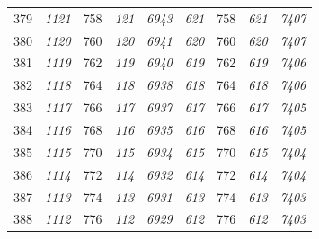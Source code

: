 \documentclass[10pt,fleqn]{article}
\begin{document}
\begin{longtable}{c|cccccccc}
379 & {\color{blue} \it 1121 \rm} & {\color{black} 758} & {\color{blue} \it 121 \rm} & {\color{blue} \it 6943 \rm} & {\color{blue} \it 621 \rm} & {\color{black} 758} & {\color{blue} \it 621 \rm} & {\color{blue} \it 7407 \rm} \\
380 & {\color{blue} \it 1120 \rm} & {\color{black} 760} & {\color{blue} \it 120 \rm} & {\color{blue} \it 6941 \rm} & {\color{blue} \it 620 \rm} & {\color{black} 760} & {\color{blue} \it 620 \rm} & {\color{blue} \it 7407 \rm} \\
381 & {\color{blue} \it 1119 \rm} & {\color{black} 762} & {\color{blue} \it 119 \rm} & {\color{blue} \it 6940 \rm} & {\color{blue} \it 619 \rm} & {\color{black} 762} & {\color{blue} \it 619 \rm} & {\color{blue} \it 7406 \rm} \\
382 & {\color{blue} \it 1118 \rm} & {\color{black} 764} & {\color{blue} \it 118 \rm} & {\color{blue} \it 6938 \rm} & {\color{blue} \it 618 \rm} & {\color{black} 764} & {\color{blue} \it 618 \rm} & {\color{blue} \it 7406 \rm} \\
383 & {\color{blue} \it 1117 \rm} & {\color{black} 766} & {\color{blue} \it 117 \rm} & {\color{blue} \it 6937 \rm} & {\color{blue} \it 617 \rm} & {\color{black} 766} & {\color{blue} \it 617 \rm} & {\color{blue} \it 7405 \rm} \\
384 & {\color{blue} \it 1116 \rm} & {\color{black} 768} & {\color{blue} \it 116 \rm} & {\color{blue} \it 6935 \rm} & {\color{blue} \it 616 \rm} & {\color{black} 768} & {\color{blue} \it 616 \rm} & {\color{blue} \it 7405 \rm} \\
385 & {\color{blue} \it 1115 \rm} & {\color{black} 770} & {\color{blue} \it 115 \rm} & {\color{blue} \it 6934 \rm} & {\color{blue} \it 615 \rm} & {\color{black} 770} & {\color{blue} \it 615 \rm} & {\color{blue} \it 7404 \rm} \\
386 & {\color{blue} \it 1114 \rm} & {\color{black} 772} & {\color{blue} \it 114 \rm} & {\color{blue} \it 6932 \rm} & {\color{blue} \it 614 \rm} & {\color{black} 772} & {\color{blue} \it 614 \rm} & {\color{blue} \it 7404 \rm} \\
387 & {\color{blue} \it 1113 \rm} & {\color{black} 774} & {\color{blue} \it 113 \rm} & {\color{blue} \it 6931 \rm} & {\color{blue} \it 613 \rm} & {\color{black} 774} & {\color{blue} \it 613 \rm} & {\color{blue} \it 7403 \rm} \\
388 & {\color{blue} \it 1112 \rm} & {\color{black} 776} & {\color{blue} \it 112 \rm} & {\color{blue} \it 6929 \rm} & {\color{blue} \it 612 \rm} & {\color{black} 776} & {\color{blue} \it 612 \rm} & {\color{blue} \it 7403 \rm} \\

\end{longtable}
\end{document}
